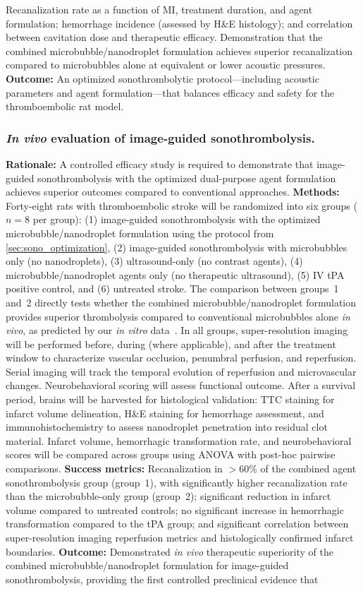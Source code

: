 Recanalization rate as a function of MI, treatment duration, and agent formulation; hemorrhage incidence (assessed by H\&E histology); and correlation between cavitation dose and therapeutic efficacy. Demonstration that the combined microbubble/nanodroplet formulation achieves superior recanalization compared to microbubbles alone at equivalent or lower acoustic pressures. \textbf{Outcome:} An optimized sonothrombolytic protocol---including acoustic parameters and agent formulation---that balances efficacy and safety for the thromboembolic rat model.

\subsubsection{\textit{In vivo} evaluation of image-guided sonothrombolysis.\label{sec:efficacy_study}}
\textbf{Rationale:} A controlled efficacy study is required to demonstrate that image-guided sonothrombolysis with the optimized dual-purpose agent formulation achieves superior outcomes compared to conventional approaches. \textbf{Methods:} Forty-eight rats with thromboembolic stroke will be randomized into six groups ($n=8$ per group): (1) image-guided sonothrombolysis with the optimized microbubble/nanodroplet formulation using the protocol from \ref{sec:sono_optimization}, (2) image-guided sonothrombolysis with microbubbles only (no nanodroplets), (3) ultrasound-only (no contrast agents), (4) microbubble/nanodroplet agents only (no therapeutic ultrasound), (5) IV tPA positive control, and (6) untreated stroke. The comparison between groups~1 and~2 directly tests whether the combined microbubble/nanodroplet formulation provides superior thrombolysis compared to conventional microbubbles alone \textit{in vivo}, as predicted by our \textit{in vitro} data~\cite{kim2022analysis}. In all groups, super-resolution imaging will be performed before, during (where applicable), and after the treatment window to characterize vascular occlusion, penumbral perfusion, and reperfusion. Serial imaging will track the temporal evolution of reperfusion and microvascular changes. Neurobehavioral scoring will assess functional outcome. After a survival period, brains will be harvested for histological validation: TTC staining for infarct volume delineation, H\&E staining for hemorrhage assessment, and immunohistochemistry to assess nanodroplet penetration into residual clot material. Infarct volume, hemorrhagic transformation rate, and neurobehavioral scores will be compared across groups using ANOVA with post-hoc pairwise comparisons. \textbf{Success metrics:} Recanalization in $>$60\% of the combined agent sonothrombolysis group (group~1), with significantly higher recanalization rate than the microbubble-only group (group~2); significant reduction in infarct volume compared to untreated controls; no significant increase in hemorrhagic transformation compared to the tPA group; and significant correlation between super-resolution imaging reperfusion metrics and histologically confirmed infarct boundaries. \textbf{Outcome:} Demonstrated \textit{in vivo} therapeutic superiority of the combined microbubble/nanodroplet formulation for image-guided sonothrombolysis, providing the first controlled preclinical evidence that 